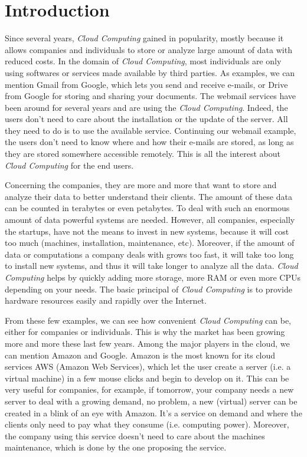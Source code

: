 

\chapter{Introduction}
Since several years, \textit{Cloud Computing} gained in popularity, mostly because it allows companies and individuals to store or analyze large amount of data with reduced costs. 
In the domain of \textit{Cloud Computing}, most individuals are only using softwares or services made available by third parties. 
As examples, we can mention Gmail from Google, which lets you send and receive e-mails, or Drive from Google for storing and sharing your documents. 
The webmail services have been around for several years and are using the \textit{Cloud Computing}. 
Indeed, the users don't need to care about the installation or the update of the server. 
All they need to do is to use the available service. Continuing our webmail example, the users don't need to know where and how their e-mails are stored, as long as they are stored somewhere accessible remotely. This is all the interest about \textit{Cloud Computing} for the end users.

Concerning the companies, they are more and more that want to store and analyze their data to better understand their clients. 
The amount of these data can be counted in terabytes or even petabytes. 
To deal with such an enormous amount of data powerful systems are needed. 
However, all companies, especially the startups, have not the means to invest in new systems, because it will cost too much (machines, installation, maintenance, etc). 
Moreover, if the amount of data or computations a company deals with grows too fast, it will take too long to install new systems, and thus it will take longer to analyze all the data. 
\textit{Cloud Computing} helps by quickly adding more storage, more RAM or even more CPUs depending on your needs. 
The basic principal of \textit{Cloud Computing} is to provide hardware resources easily and rapidly over the Internet.

From these few examples, we can see how convenient \textit{Cloud Computing} can be, either for companies or individuals. 
This is why the market has been growing more and more these last few years. 
Among the major players in the cloud, we can mention Amazon and Google. 
Amazon is the most known for its cloud services AWS (Amazon Web Services), which let the user create a server (i.e. a virtual machine) in a few mouse clicks and begin to develop on it. 
This can be very useful for companies, for example, if tomorrow, your company needs a new server to deal with a growing demand, no problem, a new (virtual) server can be created in a blink of an eye with Amazon. 
It's a service on demand and where the clients only need to pay what they consume (i.e. computing power). 
Moreover, the company using this service doesn't need to care about the machines maintenance, which is done by the one proposing the service.



